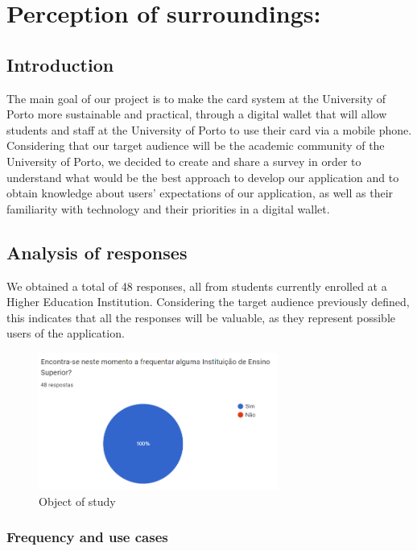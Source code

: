 \documentclass[10pt]{article}
\begin{document}
\section{Perception of surroundings:}

\subsection{Introduction}

The main goal of our project is to make the card system at the University of Porto more sustainable and practical, through a digital wallet that will allow students and staff at the University of Porto to use their card via a mobile phone.
Considering that our target audience will be the academic community of the University of Porto, we decided to create and share a survey in order to understand what would be the best approach to develop our application and
to obtain knowledge about users' expectations of our application, as well as their familiarity with technology and their priorities in a digital wallet.

\subsection{Analysis of responses}


We obtained a total of 48 responses, all from students currently enrolled at a Higher Education Institution. Considering the target audience previously defined, this indicates that all the responses will be valuable, as they represent possible users of the application.

\begin{figure}[h]
    \centering
    \includegraphics[width=0.7\textwidth]{report-images/questionaire1.png}
    \caption{Object of study}
    \label{fig:fig-3}
\end{figure}


\subsubsection{Frequency and use cases}
\end{document}
